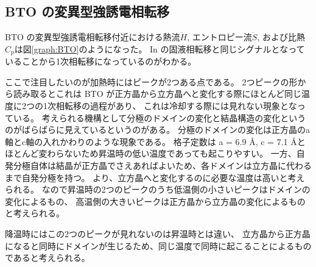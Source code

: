 \documentclass[9pt,dvipdfmx,a4paper]{jsarticle}
\begin{document}
\subsection{BTO の変異型強誘電相転移}
BTO の変異型強誘電相転移付近における熱流\(\dot{H}\), エントロピー流\(\dot{S}\), および比熱\(C_p\)は図\ref{graph:BTO}のようになった。
In の固液相転移と同じシグナルとなっていることから1次相転移になっているのがわかる。

ここで注目したいのが加熱時にはピークが2つある点である。
2つピークの形から読み取るとこれは BTO が正方晶から立方晶へと変化する際にほとんど同じ温度に2つの1次相転移の過程があり、
これは冷却する際には見れない現象となっている。
考えられる機構として分極のドメインの変化と結晶構造の変化というのがばらばらに見えているというのがある。
分極のドメインの変化は正方晶のa軸とc軸の入れかわりのような現象である。
格子定数は a = 6.9 \AA, c = 7.1 \AA とほとんど変わらないため昇温時の低い温度であっても起こりやすい。
一方、自発分極自体は結晶が正方晶でさえあればよいため、各ドメインは立方晶に代わるまで自発分極を持つ。
より、立方晶へと変化するのに必要な温度は高いと考えられる。
なので昇温時の2つのピークのうち低温側の小さいピークはドメインの変化によるもの、
高温側の大きいピークは正方晶から立方晶の変化によるものと考えられる。

降温時にはこの2つのピークが見れないのは昇温時とは違い、
立方晶から正方晶になると同時にドメインが生じるため、同じ温度で同時に起こることによるものであると考えられる。
\end{document}
